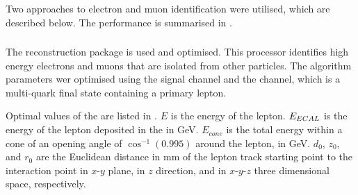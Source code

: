 Two approaches to electron and muon identification were utilised, which are described below. The performance is summarised in .



\subsubsection{\IsolatedLeptonFinderProcessor}
\label{sec:doubleHiggsIsolatedLeptonFinder}
The \IsolatedLeptonFinderProcessor reconstruction package is used and optimised. This processor identifies high energy electrons and muons that are isolated from other particles. The algorithm parameters wer optimised using the signal channel and the \eeTo{ \Pquark \Pquark \Pquark \Pquark \Plepton \Pnu} channel, which is a multi-quark final state containing a primary lepton.


Optimal values of the \IsolatedLeptonFinderProcessor are listed in . $E$ is the energy of the lepton. $E_{ECAL}$ is the energy of the lepton deposited in the \ECAL in GeV. $E_{cone}$ is the total energy within a cone of an opening angle of $\cos^{-1}(0.995)$ around the lepton, in GeV. $d_0$, $z_0$, and $r_0$ are the Euclidean distance in mm of the lepton track starting point to the interaction point in $x$-$y$ plane, in $z$ direction, and in $x$-$y$-$z$ three dimensional space, respectively.

